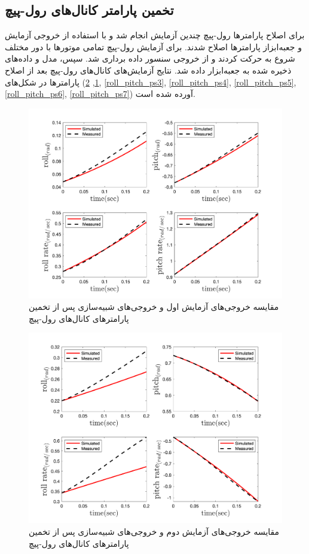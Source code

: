 \subsection{تخمین پارامتر کانال‌های رول-پیچ}
برای اصلاح پارامترها رول-پیچ چندین آزمایش انجام شد و با استفاده از خروجی آزمایش و جعبه‌ابزاز
پارامترها اصلاح شدند.
برای آزمایش رول-پیچ تمامی موتورها با دور مختلف شروع به حرکت کردند و از خروجی سنسور داده برداری شد. سپس، مدل و  داده‌های ذخیره شده به جعبه‌ابزار
داده شد. نتایج آزمایش‌های کانال‌های رول-پیچ بعد از اصلاح پارامترها در شکل‌های
(\ref{roll_pitch_ps1}, \ref{roll_pitch_ps2}, \ref{roll_pitch_ps3}, \ref{roll_pitch_ps4}, \ref{roll_pitch_ps5}, \ref{roll_pitch_ps6}, \ref{roll_pitch_ps7})
آورده شده است.

\begin{figure}[H]
	\includegraphics[width=12cm]{../../Figures/RCP/roll_pitch_parameter_estimation/RCP_roll_pitch_S1.png}
	\centering
	\caption{مقايسه خروجی‌های آزمايش اول و خروجی‌های شبیه‌سازی پس از تخمین پارامترهای کانال‌های رول-پیچ}
	\label{roll_pitch_ps1}
\end{figure}
\begin{figure}[H]
	\includegraphics[width=12cm]{../../Figures/RCP/roll_pitch_parameter_estimation/RCP_roll_pitch_S2.png}
	\centering
	\caption{مقايسه خروجی‌های آزمايش دوم و خروجی‌های شبیه‌سازی پس از تخمین پارامترهای کانال‌های رول-پیچ}
	\label{roll_pitch_ps2}
\end{figure}

